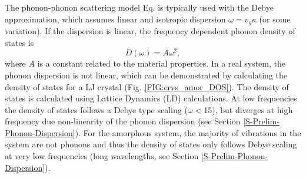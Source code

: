 \documentclass[letterpaper,12pt]{article}
\begin{document}
The phonon-phonon scattering model Eq$.$ is typically used with the Debye approximation, which assumes linear and isotropic dispersion $\omega = v_g\kappa$ (or some variation\cite{callaway1959,holland1963}). If the dispersion is linear, the frequency dependent phonon density of states is
\begin{equation}\label{EQ:M:debye_DOS}
D(\omega) = A\omega^2,
\end{equation}
where $A$ is a constant related to the material properties.\cite{ashcroft1976} In a real system, the phonon dispersion is not linear, which can be demonstrated by calculating the density of states for a LJ crystal (Fig$.$ \ref{FIG:crys_amor_DOS}). The density of states is calculated using Lattice Dynamics (LD) calculations.\cite{dove1993} At low frequencies the density of states follows a Debye type scaling ($\omega<$15), but diverges at high frequency due non-linearity of the phonon dispersion (see Section \ref{S-Prelim-Phonon-Dispersion}). For the amorphous system, the majority of vibrations in the system are not phonons and thus the density of states only follows Debye scaling at very low frequencies (long wavelengths, see Section \ref{S-Prelim-Phonon-Dispersion}).
\end{document}
